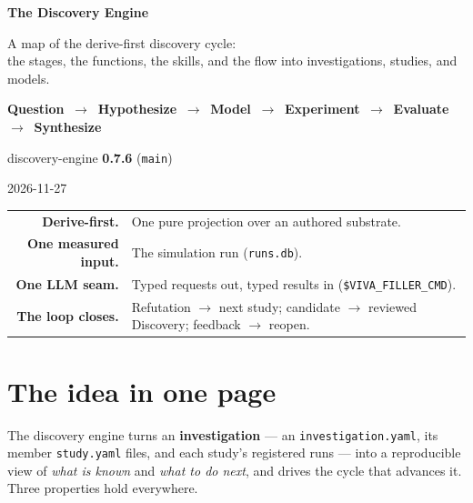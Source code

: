 \documentclass[11pt]{article}
\newcommand{\code}[1]{\texttt{\small #1}}
\begin{document}
\begin{titlepage}
\centering
\vspace*{3cm}
{\Huge\bfseries\color{ink} The Discovery Engine\par}
\vspace{0.8em}
{\large\color{muted} A map of the derive-first discovery cycle:\\[2pt]
the stages, the functions, the skills, and the flow into investigations, studies, and models.\par}
\vspace{1.1em}
{\large\color{ink}\textbf{Question \,$\rightarrow$\, Hypothesize \,$\rightarrow$\, Model \,$\rightarrow$\, Experiment \,$\rightarrow$\, Evaluate \,$\rightarrow$\, Synthesize}\par}
\vspace{2.4cm}
{\large discovery-engine \textbf{0.7.6} \; (\code{main})\par}
\vspace{0.4em}
{\color{muted} 2026-11-27\par}
\vspace{2cm}
{\color{muted}\small
\begin{tabular}{@{}r@{\;\;}l@{}}
\textcolor{ink}{\textbf{Derive-first.}} & One pure projection over an authored substrate.\\
\textcolor{ink}{\textbf{One measured input.}} & The simulation run (\code{runs.db}).\\
\textcolor{ink}{\textbf{One LLM seam.}} & Typed requests out, typed results in (\code{\$VIVA\_FILLER\_CMD}).\\
\textcolor{ink}{\textbf{The loop closes.}} & Refutation $\rightarrow$ next study; candidate $\rightarrow$ reviewed Discovery; feedback $\rightarrow$ reopen.\\
\end{tabular}\par}
\vfill
\end{titlepage}

\section{The idea in one page}

The discovery engine turns an \textbf{investigation} --- an \code{investigation.yaml}, its
member \code{study.yaml} files, and each study's registered runs --- into a reproducible
view of \emph{what is known} and \emph{what to do next}, and drives the cycle that advances
it. Three properties hold everywhere.
\end{document}
